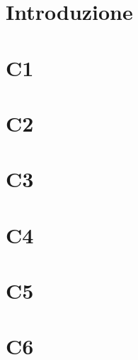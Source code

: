 \documentclass[a4paper, oneside, openany, dvipsnames, table]{article}
\begin{document}
\copertina{}



\newpage
\tableofcontents

\newpage
\section{Introduzione}\label{sec:Introduzione}


\newpage
\section{C1}\label{sec:C1}


\newpage
\section{C2}\label{sec:C2}


\newpage
\section{C3}\label{sec:C3}


\newpage
\section{C4}\label{sec:C4}


\newpage
\section{C5}\label{sec:C5}


\newpage
\section{C6}\label{sec:C6}

\end{document}
